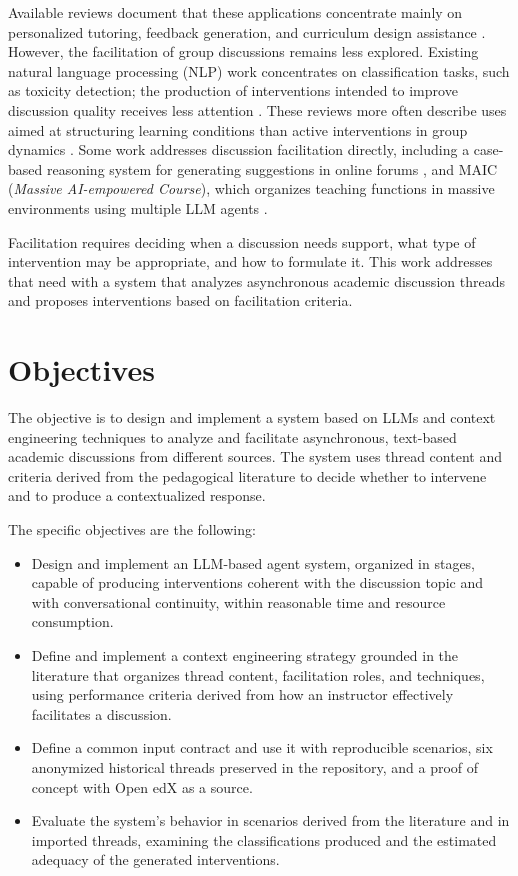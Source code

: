 Available reviews document that these applications concentrate mainly on personalized tutoring, feedback generation, and curriculum design assistance \parencite{ChuEtAl2025}. However, the facilitation of group discussions remains less explored. Existing natural language processing (NLP) work concentrates on classification tasks, such as toxicity detection; the production of interventions intended to improve discussion quality receives less attention \parencite{KorreEtAl2025}. These reviews more often describe uses aimed at structuring learning conditions than active interventions in group dynamics \parencite{CasebourneEtAl2025}. Some work addresses discussion facilitation directly, including a case-based reasoning system for generating suggestions in online forums \parencite{GuEtAl2021}, and MAIC (\textit{Massive AI-empowered Course}), which organizes teaching functions in massive environments using multiple LLM agents \parencite{YuEtAl2024maic}.

Facilitation requires deciding when a discussion needs support, what type of intervention may be appropriate, and how to formulate it. This work addresses that need with a system that analyzes asynchronous academic discussion threads and proposes interventions based on facilitation criteria.

\section{Objectives}

The objective is to design and implement a system based on LLMs and context engineering techniques to analyze and facilitate asynchronous, text-based academic discussions from different sources. The system uses thread content and criteria derived from the pedagogical literature to decide whether to intervene and to produce a contextualized response.

The specific objectives are the following:

\begin{itemize}
  \item Design and implement an LLM-based agent system, organized in stages, capable of producing interventions coherent with the discussion topic and with conversational continuity, within reasonable time and resource consumption.
  \item Define and implement a context engineering strategy grounded in the literature that organizes thread content, facilitation roles, and techniques, using performance criteria derived from how an instructor effectively facilitates a discussion.
  \item Define a common input contract and use it with reproducible scenarios, six anonymized historical threads preserved in the repository, and a proof of concept with Open edX as a source.
  \item Evaluate the system's behavior in scenarios derived from the literature and in imported threads, examining the classifications produced and the estimated adequacy of the generated interventions.
\end{itemize}

